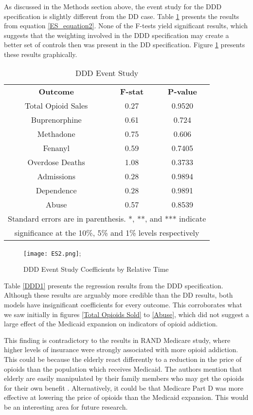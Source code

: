 \documentclass[11pt]{article}
\begin{document}
As discussed in the Methods section above, the event study for the DDD specification is slightly different from the DD case.  Table \ref{DDD Event Study} presents the results from equation \ref{ES_equation2}.  None of the F-tests yield significant results, which suggests that the weighting involved in the DDD specification may create a better set of controls then was present in the DD specification.  Figure \ref{ESpic2} presents these results graphically.

\begin{table}[htb]
\centering
\scriptsize
\caption{DDD Event Study} 
\label{DDD Event Study}
\begin{tabular}{ccc}
\hline \hline
 \textbf{Outcome} & \textbf{F-stat} & \textbf{P-value} \\
Total Opioid Sales &0.27 & 0.9520 \\
Buprenorphine & 0.61 & 0.724 \\
Methadone &0.75 & 0.606\\
Fenanyl  &0.59 & 0.7405 \\
Overdose Deaths  &1.08 & 0.3733\\
Admissions  &0.28 & 0.9894 \\
Dependence  &0.28 & 0.9891 \\
Abuse  &0.57 & 0.8539\\
\hline
\multicolumn{3}{c}{\tiny{Standard errors are in parenthesis.  *, **, and *** indicate }} \\
\multicolumn{3}{c}{\tiny{significance at the 10\%, 5\% and 1\% levels respectively}} \\
\hline
\end{tabular}
\end{table}

 \begin{figure}
    \centering    
     \texttt{[image: ES2.png]};
    \caption{DDD Event Study Coefficients by Relative Time}
    \label{ESpic2}
\end{figure}
  


Table \ref{DDD1} presents the regression results from the DDD specification.  Although these results are arguably more credible than the DD results, both models have insignificant coefficients for every outcome.  This corroborates what we saw initially in figures \ref{Total Opioids Sold} to \ref{Abuse}, which did not suggest a large effect of the Medicaid expansion on indicators of opioid addiction.

This finding is contradictory to the results in RAND Medicare study, where higher levels of insurance were strongly associated with more opioid addiction.  This could be because the elderly react differently to a reduction in the price of opioids than the population which receives Medicaid.  The authors mention that elderly are easily manipulated by their family members who may get the opioids for their own benefit \citep{Powell2016}.   Alternatively, it could be that Medicare Part D was more effective at lowering the price of opioids than the Medicaid expansion.  This would be an interesting area for future research.  
\end{document}
